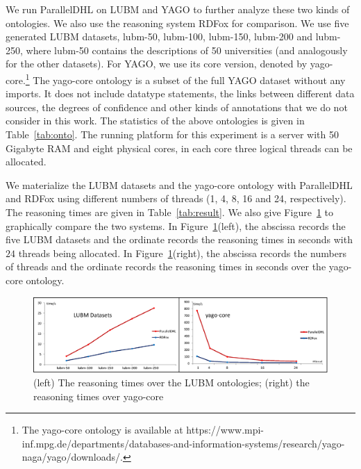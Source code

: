We run ParallelDHL on LUBM and YAGO to further analyze these
two kinds of ontologies. We also use the reasoning system RDFox \cite{MotikNPHO14}
for comparison. We use five generated LUBM datasets, lubm-50, lubm-100, lubm-150, lubm-200
and lubm-250, where lubm-50 contains the descriptions of 50
universities (and analogously for the other datasets). For YAGO, we use its core version, denoted by yago-core.\footnote{
The yago-core ontology is available at https://www.mpi-inf.mpg.de/departments/databases-and-information-systems/research/yago-naga/yago/downloads/.}
The yago-core ontology is a subset of the full YAGO dataset without any imports.
It does not include datatype statements, the links
between different data sources, the degrees of confidence and other kinds of
annotations that we do not consider in this work. The statistics of the above ontologies is given in Table~\ref{tab:onto}.
The running platform for this experiment is a server with 50 Gigabyte RAM and eight physical cores, in each core
three logical threads can be allocated.

We materialize the LUBM datasets and the yago-core ontology with ParallelDHL and RDFox using different numbers of
threads (1, 4, 8, 16 and 24, respectively).
The reasoning times are given in Table~\ref{tab:result}. We also give Figure~\ref{fig:reasoningtime} to
graphically compare the two systems.
In Figure~\ref{fig:reasoningtime}(left), the abscissa records the five
LUBM datasets and
the ordinate records the reasoning times in seconds with $24$ threads being allocated.
In Figure~\ref{fig:reasoningtime}(right), the abscissa records the numbers of threads and
the ordinate records the reasoning times in seconds over the yago-core ontology.


\begin{figure}[htbp]
\begin{center}
\includegraphics[width=\textwidth]{fig-reasoningtime.eps}
\caption{(left) The reasoning times over the LUBM ontologies; (right)
  the reasoning times over yago-core}
\label{fig:reasoningtime}
\end{center}
\end{figure}

